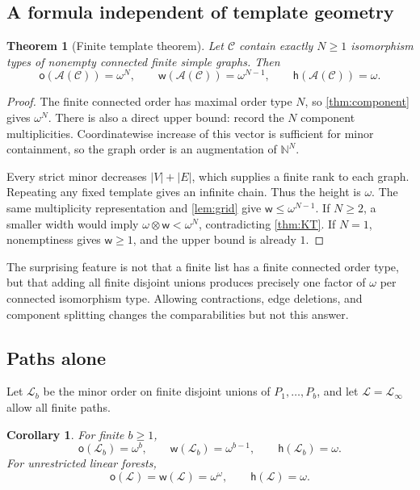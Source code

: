 \documentclass[11pt,letterpaper]{article}
\theoremstyle{plain}
\newtheorem{theorem}{Theorem}[section]
\newtheorem{corollary}[corollary]{Corollary}
\theoremstyle{definition}
\theoremstyle{remark}
\newcommand{\N}{\mathbb N}
\newcommand{\mot}{\mathsf o}
\newcommand{\wid}{\mathsf w}
\newcommand{\hei}{\mathsf h}
\newcommand{\Cl}{\mathcal C}
\newcommand{\Add}{\mathcal A}
\newcommand{\LF}{\mathcal L}
\newcommand{\Inf}{\infty}
\begin{document}
\subsection{A formula independent of template geometry}

\begin{theorem}[Finite template theorem]\label{thm:finite}
Let $\Cl$ contain exactly $N\ge1$ isomorphism types of nonempty connected
finite simple graphs. Then
\[
 \mot(\Add(\Cl))=\omega^N,\qquad
 \wid(\Add(\Cl))=\omega^{N-1},\qquad
 \hei(\Add(\Cl))=\omega.
\]
\end{theorem}

\begin{proof}
The finite connected order has maximal order type $N$, so
\cref{thm:component} gives $\omega^N$. There is also a direct upper
bound: record the $N$ component multiplicities. Coordinatewise increase
of this vector is sufficient for minor containment, so the graph order
is an augmentation of $\N^N$.

Every strict minor decreases $|V|+|E|$, which supplies a finite rank to
each graph. Repeating any fixed template gives an infinite chain. Thus
the height is $\omega$. The same multiplicity representation and
\cref{lem:grid} give $\wid\le\omega^{N-1}$. If $N\ge2$, a smaller width
would imply $\omega\otimes\wid<\omega^N$, contradicting
\cref{thm:KT}. If $N=1$, nonemptiness gives $\wid\ge1$, and the upper
bound is already $1$.
\end{proof}

The surprising feature is not that a finite list has a finite connected
order type, but that adding all finite disjoint unions produces precisely
one factor of $\omega$ per connected isomorphism type. Allowing
contractions, edge deletions, and component splitting changes the
comparabilities but not this answer.

\subsection{Paths alone}

Let $\LF_b$ be the minor order on finite disjoint unions of
$P_1,\ldots,P_b$, and let $\LF=\LF_{\Inf}$ allow all finite paths.

\begin{corollary}\label{cor:linearforests}
For finite $b\ge1$,
\[
 \mot(\LF_b)=\omega^b,\qquad
 \wid(\LF_b)=\omega^{b-1},\qquad
 \hei(\LF_b)=\omega.
\]
For unrestricted linear forests,
\[
 \mot(\LF)=\wid(\LF)=\omega^\omega,\qquad \hei(\LF)=\omega.
\]
\end{corollary}
\end{document}
